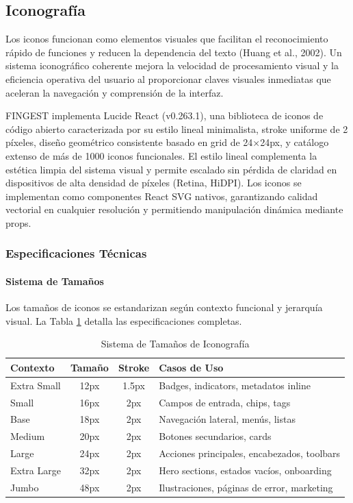 \documentclass[12pt,a4paper,oneside]{article}
\begin{document}
\subsection{Iconografía}

Los iconos funcionan como elementos visuales que facilitan el reconocimiento rápido de funciones y reducen la dependencia del texto (Huang et al., 2002). Un sistema iconográfico coherente mejora la velocidad de procesamiento visual y la eficiencia operativa del usuario al proporcionar claves visuales inmediatas que aceleran la navegación y comprensión de la interfaz.

FINGEST implementa Lucide React (v0.263.1), una biblioteca de iconos de código abierto caracterizada por su estilo lineal minimalista, stroke uniforme de 2 píxeles, diseño geométrico consistente basado en grid de 24×24px, y catálogo extenso de más de 1000 iconos funcionales. El estilo lineal complementa la estética limpia del sistema visual y permite escalado sin pérdida de claridad en dispositivos de alta densidad de píxeles (Retina, HiDPI). Los iconos se implementan como componentes React SVG nativos, garantizando calidad vectorial en cualquier resolución y permitiendo manipulación dinámica mediante props.

\subsubsection{Especificaciones Técnicas}

\paragraph{Sistema de Tamaños}
Los tamaños de iconos se estandarizan según contexto funcional y jerarquía visual. La Tabla \ref{tab:iconos-tamanios} detalla las especificaciones completas.

\begin{table}[h]
\centering
\caption{Sistema de Tamaños de Iconografía}
\label{tab:iconos-tamanios}
\begin{tabular}{|l|c|c|p{5cm}|}
\hline
\textbf{Contexto} & \textbf{Tamaño} & \textbf{Stroke} & \textbf{Casos de Uso} \\
\hline
Extra Small & 12px & 1.5px & Badges, indicators, metadatos inline \\
\hline
Small & 16px & 2px & Campos de entrada, chips, tags \\
\hline
Base & 18px & 2px & Navegación lateral, menús, listas \\
\hline
Medium & 20px & 2px & Botones secundarios, cards \\
\hline
Large & 24px & 2px & Acciones principales, encabezados, toolbars \\
\hline
Extra Large & 32px & 2px & Hero sections, estados vacíos, onboarding \\
\hline
Jumbo & 48px & 2px & Ilustraciones, páginas de error, marketing \\
\hline
\end{tabular}
\end{table}
\end{document}
